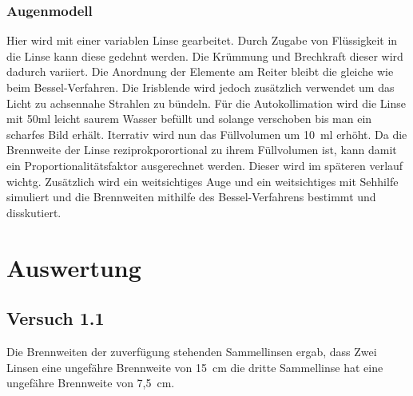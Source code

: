 \documentclass[a4paper, 12pt]{article}
\begin{document}
\subsubsection{Augenmodell}
Hier wird mit einer variablen Linse gearbeitet. Durch Zugabe von Flüssigkeit in die Linse kann diese gedehnt werden. Die Krümmung und Brechkraft dieser wird dadurch variiert. Die Anordnung der Elemente am Reiter bleibt die gleiche wie beim Bessel-Verfahren. Die Irisblende wird jedoch zusätzlich verwendet um das Licht zu achsennahe Strahlen zu bündeln. Für die Autokollimation wird die Linse mit 50ml leicht saurem Wasser befüllt und solange verschoben bis man ein scharfes Bild erhält. Iterrativ wird nun das Füllvolumen um 10\ ml erhöht. Da die Brennweite der Linse reziprokporortional zu ihrem Füllvolumen ist, kann damit ein Proportionalitätsfaktor ausgerechnet werden. Dieser wird im späteren verlauf wichtg. Zusätzlich wird ein weitsichtiges Auge und ein weitsichtiges mit Sehhilfe simuliert und die Brennweiten mithilfe des Bessel-Verfahrens bestimmt und disskutiert. 


\section{Auswertung}
\subsection{Versuch 1.1}
	Die Brennweiten der zuverfügung stehenden Sammellinsen ergab, dass Zwei Linsen eine ungefähre Brennweite von 15\ cm die dritte Sammellinse hat eine ungefähre Brennweite von 7,5\ cm.\\
\end{document}
